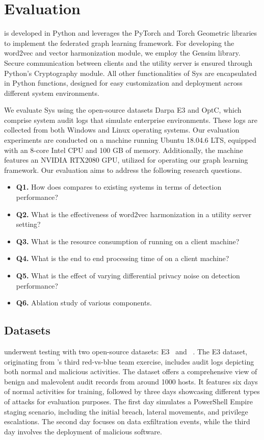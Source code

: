  \section{Evaluation}
 \label{sec:eval}

\Sys is developed in Python and leverages the PyTorch and Torch Geometric libraries to implement the federated graph learning framework. For developing the word2vec and vector harmonization module, we employ the Gensim library. Secure communication between clients and the utility server is ensured through Python's Cryptography module. All other functionalities of Sys are encapsulated in Python functions, designed for easy customization and deployment across different system environments.

We evaluate Sys using the open-source datasets Darpa E3 and OptC, which comprise system audit logs that simulate enterprise environments. These logs are collected from both Windows and Linux operating systems. Our evaluation experiments are conducted on a machine running Ubuntu 18.04.6 LTS, equipped with an 8-core Intel CPU and 100 GB of memory. Additionally, the machine features an NVIDIA RTX2080 GPU, utilized for operating our graph learning framework. Our evaluation aims to address the following research questions.

\begin{itemize}[leftmargin=*]
\item \textbf{Q1.} How does \Sys compares to existing systems in terms of detection performance?
\item \textbf{Q2.} What is the effectiveness of word2vec harmonization in a utility server setting?
\item \textbf{Q3.} What is the resource consumption of \Sys running on a client machine?
\item \textbf{Q4.} What is the end to end processing time of \Sys on a client machine?
\item \textbf{Q5.} What is the effect of varying differential privacy noise on detection performance?
\item \textbf{Q6.} Ablation study of various \Sys components.
\end{itemize}

\subsection*{Datasets}
\Sys underwent testing with two open-source datasets: \darpa E3~\cite{darpae3} and \darpa \optc~\cite{darpatc}. The E3 dataset, originating from \darpa's third red-vs-blue team exercise, includes audit logs depicting both normal and malicious activities. The \darpa \optc dataset offers a comprehensive view of benign and malevolent audit records from around 1000 hosts. It features six days of normal activities for training, followed by three days showcasing different types of attacks for evaluation purposes. The first day simulates a PowerShell Empire staging scenario, including the initial breach, lateral movements, and privilege escalations. The second day focuses on data exfiltration events, while the third day involves the deployment of malicious software.

